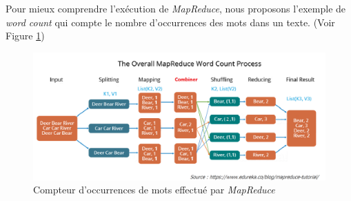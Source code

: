 Pour mieux comprendre l'exécution de {\it MapReduce}, nous proposons l'exemple de {\it word count} qui compte le nombre d'occurrences des mots dans un texte. (Voir Figure \ref{fig:mrwcp})

\begin{figure}[H]
  \centering
    \includegraphics[width=1\textwidth]{images/mapreduce_process.png}
        \caption{Compteur d'occurrences de mots effectué par {\it MapReduce}}
          \label{fig:mrwcp}
\end{figure}
